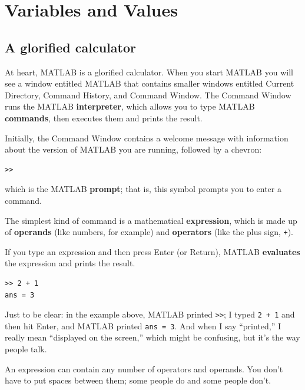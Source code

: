 \documentclass[
]{book}
\begin{document}
\newpage


\tableofcontents

\mainmatter

\chapter{Variables and Values}

\section{A glorified calculator}
\label{sect:calc}

At heart, MATLAB is a glorified calculator.  When you start MATLAB
you will see a window
entitled {\sf MATLAB} that contains smaller windows entitled {\sf
Current Directory}, {\sf Command History}, and {\sf Command Window}.
The Command Window runs the MATLAB {\bf interpreter}, which allows you
to type MATLAB {\bf commands}, then executes them and prints the
result.

Initially, the Command Window contains a welcome message with information
about the version of MATLAB you are running, followed by a chevron:

\begin{verbatim}
>>
\end{verbatim}

which is the MATLAB {\bf prompt}; that is, this symbol prompts you
to enter a command.

The simplest kind of command is a mathematical {\bf expression}, which
is made up of {\bf operands} (like numbers, for example) and
{\bf operators} (like the plus sign, {\tt +}).

If you type an expression and then press Enter (or Return), MATLAB
{\bf evaluates} the expression and prints the result.

\begin{verbatim}
>> 2 + 1
ans = 3
\end{verbatim}

Just to be clear: in the example above, MATLAB printed {\tt >>}; I
typed {\tt 2 + 1} and then hit Enter, and MATLAB printed {\tt ans = 3}.
And when I say ``printed,'' I really mean ``displayed on the screen,''
which might be confusing, but it's the way people talk.

An expression can contain any number of operators and operands.  You
don't have to put spaces between them; some people do and some people
don't.
\end{document}
